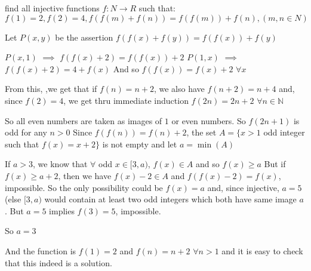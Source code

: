 


\begin{solution}
	\begin{tcolorbox}find all  injective functions $f:N\rightarrow R$ such that:
$f(1)=2,f(2)=4,f(f(m)+f(n))=f(f(m))+f(n),  (m,n\in N)$\end{tcolorbox}
Let $P(x,y)$ be the assertion  $f(f(x)+f(y))=f(f(x))+f(y)$

$P(x,1)$ $\implies$ $f(f(x)+2)=f(f(x))+2$
$P(1,x)$ $\implies$ $f(f(x)+2)=4+f(x)$
And so $f(f(x))=f(x)+2$ $\forall x$

From this, ,we get that if $f(n)=n+2$, we also have $f(n+2)=n+4$ and, since $f(2)=4$, we get thru immediate induction $f(2n)=2n+2$ $\forall n\in\mathbb N$

So all even numbers are taken as images of $1$ or even numbers. So $f(2n+1)$ is odd for any $n>0$
Since $f(f(n))=f(n)+2$, the set $A=\{x>1$ odd integer such that $f(x)=x+2\}$ is not empty and let $a=\min(A)$

If $a>3$, we know that $\forall$ odd $x\in[3,a)$, $f(x)\in A$ and so $f(x)\ge a$
But if $f(x)\ge a+2$, then we have $f(x)-2\in A$ and $f(f(x)-2)=f(x)$, impossible.
So the only possibility could be $f(x)=a$ and, since injective, $a=5$ (else $[3,a)$ would contain at least two odd integers which both have same image $a$.
But $a=5$ implies $f(3)=5$, impossible.

So $a=3$

And the function is $f(1)=2$ and $f(n)=n+2$ $\forall n>1$ and it is easy to check that this indeed is a solution.
\end{solution}




